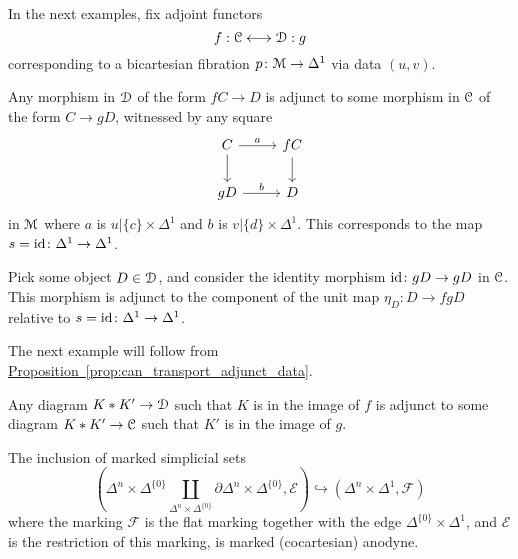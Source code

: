 \documentclass[main.tex]{subfiles}
\begin{document}
In the next examples, fix adjoint functors
\begin{equation*}
  f : \mathcal{C} \longleftrightarrow \mathcal{D} : g
\end{equation*}
corresponding to a bicartesian fibration $p\colon \mathcal{M} \to \Delta^{1}$ via data $(u, v)$.

\begin{example}
  Any morphism in $\mathcal{D}$ of the form $fC \to D$ is adjunct to some morphism in $\mathcal{C}$ of the form $C \to gD$, witnessed by any square
  \begin{equation*}
    \begin{tikzcd}
      C
      \arrow[r, "a"]
      \arrow[d]
      & fC
      \arrow[d]
      \\
      gD
      \arrow[r, "b"]
      & D
    \end{tikzcd}
  \end{equation*}
  in $\mathcal{M}$ where $a$ is $u|\{c\} \times \Delta^{1}$ and $b$ is $v|\{d\} \times \Delta^{1}$. This corresponds to the map $s = \mathrm{id}\colon \Delta^{1} \to \Delta^{1}$.
\end{example}

\begin{example}
  Pick some object $D \in \mathcal{D}$, and consider the identity morphism $\mathrm{id}\colon gD \to gD$ in $\mathcal{C}$. This morphism is adjunct to the component of the unit map $\eta_{D}\colon D \to fgD$ relative to $s = \mathrm{id}\colon \Delta^{1} \to \Delta^{1}$.
\end{example}

The next example will follow from \hyperref[prop:can_transport_adjunct_data]{Proposition~\ref*{prop:can_transport_adjunct_data}}.

\begin{example}
  Any diagram $K \ast K' \to \mathcal{D}$ such that $K$ is in the image of $f$ is adjunct to some diagram $K \ast K' \to \mathcal{C}$ such that $K'$ is in the image of $g$.
\end{example}

\begin{lemma}
  \label{lemma:left_cylinder_inclusion_marked_anodyne}
  The inclusion of marked simplicial sets
  \begin{equation}
    \label{eq:cocartesian_anodyne_morphism}
    \left( \Delta^{n} \times \Delta^{\{0\}} \coprod_{\Delta^{n} \times \Delta^{\{0\}}} \partial \Delta^{n} \times \Delta^{\{0\}}, \mathcal{E} \right) \hookrightarrow (\Delta^{n} \times \Delta^{1}, \mathcal{F})
  \end{equation}
  where the marking $\mathcal{F}$ is the flat marking together with the edge $\Delta^{\{0\}} \times \Delta^{1}$, and $\mathcal{E}$ is the restriction of this marking, is marked (cocartesian) anodyne.
\end{lemma}
\end{document}
